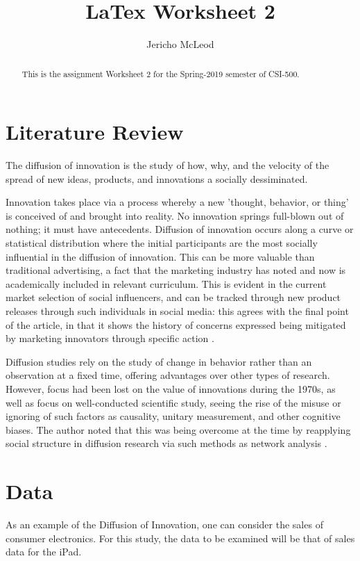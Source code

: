 \documentclass[11pt]{article}
\title{LaTex Worksheet 2}
\author{Jericho McLeod}
\begin{document}
\maketitle

\begin{abstract}
This is the assignment Worksheet 2 for the Spring-2019 semester of CSI-500.
\end{abstract}

\section{Literature Review}
The diffusion of innovation is the study of how, why, and the velocity of the spread of new ideas, products, and innovations a socially dessiminated. 


Innovation takes place via a process whereby a new 'thought, behavior, or thing' is conceived of and brought into reality. No innovation springs full-blown out of nothing; it must have antecedents. Diffusion of innovation occurs along a curve or statistical distribution where the initial participants are the most socially influential in the diffusion of innovation. This can be more valuable than traditional advertising, a fact that the marketing industry has noted and now is academically included in relevant curriculum. This is evident in the current market selection of social influencers, and can be tracked through new product releases through such individuals in social media: this agrees with the final point of the article, in that it shows the history of concerns expressed being mitigated by marketing innovators through specific action  \cite{Robertson67}.


Diffusion studies rely on the study of change in behavior rather than an observation at a fixed time, offering advantages over other types of research. However, focus had been lost on the value of innovations during the 1970s, as well as focus on well-conducted scientific study, seeing the rise of the misuse or ignoring of such factors as causality, unitary measurement, and other cognitive biases. The author noted that this was being overcome at the time by reapplying social structure in diffusion research via such methods as network analysis \cite{Rogers76}.


\section{Data}
As an example of the Diffusion of Innovation, one can consider the sales of consumer electronics. For this study, the data to be examined will be that of sales data for the iPad. 
\end{document}
